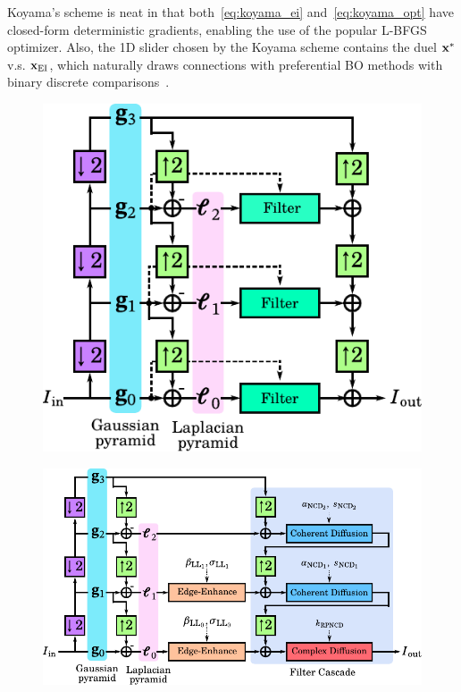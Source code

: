 Koyama's scheme is neat in that both~\cref{eq:koyama_ei} and~\cref{eq:koyama_opt} have closed-form deterministic gradients, enabling the use of the popular L-BFGS~\cite{liu_limited_1989} optimizer.
Also, the 1D slider chosen by the Koyama scheme contains the duel \(\mathbf{x}^*\) v.s. \(\mathbf{x}_{\mathrm{EI}}\), which naturally draws connections with preferential BO methods with binary discrete comparisons~\cite{NIPS2007_b6a1085a}.


\begin{figure}
  \hspace{-0.3in}
  \centering
  \begin{minipage}[c]{0.43\textwidth}
    \centering
    \includegraphics[scale=0.65]{figures/conventional_laplacian_pyramid.pdf}
    \label{fig:lpnd}
  \end{minipage}
  \begin{minipage}[c]{0.53\textwidth}
    \centering
    \includegraphics[scale=0.65]{figures/multiscale_filter.pdf}

\end{minipage}
\end{figure}
